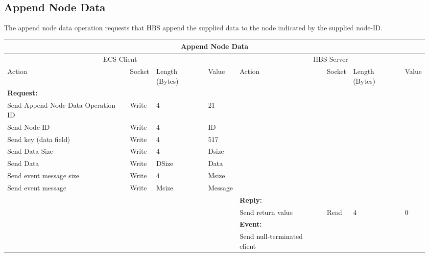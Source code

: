 \newpage
\subsection{Append Node Data}

The append node data operation requests that HBS append the supplied
data to the node indicated by the supplied node-ID.



\bigskip
\small
\begin{tabular}{|p{1.2in}|p{.4in}|p{.4in}|p{.5in}|p{1.2in}|p{.4in}|p{.4in}|p{.5in} |} \hline
\multicolumn{8}{|c|}{{\bf Append Node Data}} \\ \hline
\multicolumn{4}{|c|}{ECS Client} & \multicolumn{4}{|c|}{HBS Server} \\ \hline
Action            & Socket & Length  
                            (Bytes)& Value & Action       & Socket & Length 
                                                                    (Bytes)& Value \\ \hline
\multicolumn{4}{|l}{{\bf Request:}}&\multicolumn{4}{|l|}{~} \\ \hline
Send Append Node Data Operation ID  & Write  & 4     & 21     &              &        &       &       \\ \hline
Send Node-ID      & Write  & 4     &  ID &           &        &       &       \\ \hline
Send key (data field)    & Write  & 4     & 517   &              &        &       &       \\ \hline
Send Data Size    & Write  & 4     &  Dsize &        &        &       &       \\ \hline
Send Data         & Write  &  DSize &  Data &   &        &       &       \\ \hline
Send event
message size      & Write  & 4     &  Msize &         &        &       &       \\ \hline
Send event message
                  & Write  &  Msize  &  Message &     &        &       &       \\ \hline
\multicolumn{4}{|l}{~}&\multicolumn{4}{|l|}{{\bf Reply:}} \\ \hline
                  &        &       &       & Send return
                                             value        & Read   &  4    & 0       \\ \hline
\multicolumn{4}{|l}{~}&\multicolumn{4}{|l|}{{\bf Event:}} \\ \hline
                  &        &       &       & Send null-terminated client

\end{tabular}
